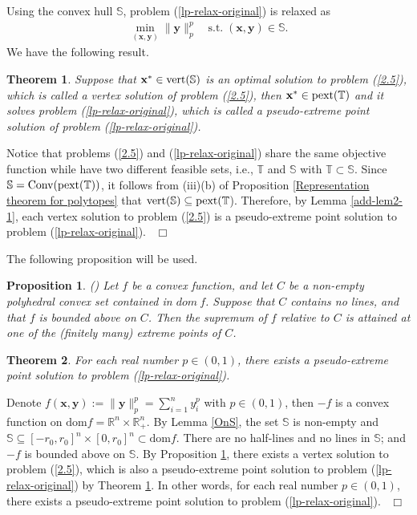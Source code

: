 \documentclass[12pt]{article}
\newtheorem{Theorem}{Theorem}[part]
\newtheorem{Proposition}{Proposition}[part]
\def \ep{\hbox{ }\hfill$\Box$}
\begin{document}
Using the convex hull $\mathbb{S}$, problem (\ref{lp-relax-original}) is relaxed as
\begin{eqnarray}\label{2.5}
\min\limits_{(\mathbf{x},\mathbf{y})}\|\mathbf{y}\|_p^p\quad \textrm{s.t.}\; (\mathbf{x},\mathbf{y})\in \mathbb{S}.
\end{eqnarray}
We have the following result.
\begin{Theorem}\label{add-lem2-2}
Suppose that $\mathbf{x}^*\in \mathrm{\rm vert }(\mathbb{S})$ is an optimal solution to  problem {\rm(\ref{2.5})}, which is called a vertex solution of problem
{\rm(\ref{2.5})}, then $\mathbf{x}^*\in \mathrm{\rm pext}(\mathbb{T})$ and it solves problem {\rm(\ref{lp-relax-original})}, which is called a pseudo-extreme
point solution of problem {\rm(\ref{lp-relax-original})}.
\end{Theorem}

Notice that problems (\ref{2.5}) and (\ref{lp-relax-original}) share the same objective function while have two different feasible sets, i.e.,  $\mathbb{T}$ and $\mathbb{S}$ with $\mathbb{T}\subset\mathbb{S}$. Since $\mathbb{S}=\textrm{Conv}(\mathrm{\rm pext}(\mathbb{T}))$, it follows from (iii)(b) of Proposition \ref{Representation theorem for polytopes} that $\mathrm{\rm vert }(\mathbb{S})\subseteq\mathrm{\rm pext}(\mathbb{T}$). Therefore, by Lemma \ref{add-lem2-1}, each vertex solution to problem (\ref{2.5}) is a pseudo-extreme point solution to problem (\ref{lp-relax-original}).
\ep

The following proposition will be used.
\begin{Proposition}\label{Rock70bk_Corollary2_P345}\textrm{\rm (\cite[Corollary 32.3.4]{Rock70bk})}
Let $f$ be a convex function, and let $C$ be a non-empty polyhedral convex set contained in $dom~f$. Suppose that  $C$ contains no lines,  and that $f$ is bounded above on $C$. Then the supremum of $f$
relative to $C$ is attained   at one of the (finitely many) extreme points of $C$.
\end{Proposition}

\begin{Theorem}\label{add-lem3-1} For each real number $p\in (0,1)$, there exists a pseudo-extreme point solution to problem (\ref{lp-relax-original}).
 \end{Theorem}

Denote $f(\mathbf{x},\mathbf{y}):=\|\mathbf{y}\|_p^p=\sum\limits_{i=1}^ny_i^p$ with $p\in (0,1)$, then $-f$ is a convex function on
$\textrm{dom}f=\mathbb{R}^n\times\mathbb{R}^n_+$. By Lemma \ref{OnS}, the set $\mathbb{S}$ is non-empty and
$\mathbb{S}\subseteq[-r_0,r_0]^n\times[0,r_0]^n\subset\textrm{dom}f$. There are no half-lines and no lines in $\mathbb{S}$; and
$-f$ is bounded above on $\mathbb{S}$. By Proposition \ref{Rock70bk_Corollary2_P345}, there exists a vertex solution to problem {\rm(\ref{2.5})}, which is also a pseudo-extreme point solution to problem (\ref{lp-relax-original}) by Theorem \ref{add-lem2-2}. In other words, for each real number $p\in (0, 1)$, there exists a pseudo-extreme point solution to problem (\ref{lp-relax-original}).
\ep
\end{document}
